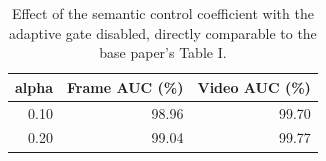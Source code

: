 \begin{table}[!t]
\centering
\caption{Effect of the semantic control coefficient with the adaptive gate disabled, directly comparable to the base paper's Table I.}
\label{tab:tableI_alpha_sweep}
\footnotesize
\begin{tabular}{rrr}
\hline\hline
alpha & Frame AUC (\%) & Video AUC (\%) \\
\hline
0.10 & 98.96 & 99.70 \\
0.20 & 99.04 & 99.77 \\
\hline\hline
\end{tabular}
\end{table}
